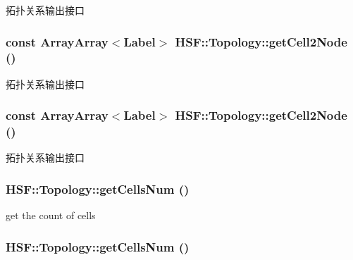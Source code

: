拓扑关系输出接口 \hypertarget{classHSF_1_1Topology_a4773996f5f708d964b87256318266497}{
\subsubsection[{getCell2Node}]{\setlength{\rightskip}{0pt plus 5cm}const {\bf ArrayArray}$<${\bf Label}$>$ HSF::Topology::getCell2Node ()}}
\label{classHSF_1_1Topology_a4773996f5f708d964b87256318266497}


拓扑关系输出接口 \hypertarget{classHSF_1_1Topology_a4773996f5f708d964b87256318266497}{
\subsubsection[{getCell2Node}]{\setlength{\rightskip}{0pt plus 5cm}const {\bf ArrayArray}$<${\bf Label}$>$ HSF::Topology::getCell2Node ()}}
\label{classHSF_1_1Topology_a4773996f5f708d964b87256318266497}


拓扑关系输出接口 \hypertarget{classHSF_1_1Topology_ae29fdf46363c034e08ba9a7b6eaeb912}{
\subsubsection[{getCellsNum}]{ HSF::Topology::getCellsNum ()}}
\label{classHSF_1_1Topology_ae29fdf46363c034e08ba9a7b6eaeb912}


get the count of cells \hypertarget{classHSF_1_1Topology_ae29fdf46363c034e08ba9a7b6eaeb912}{
\subsubsection[{getCellsNum}]{ HSF::Topology::getCellsNum ()}}
\label{classHSF_1_1Topology_ae29fdf46363c034e08ba9a7b6eaeb912}


